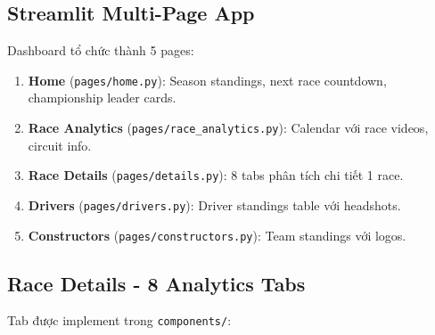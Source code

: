 \documentclass[conference,10pt]{IEEEtran}
\begin{document}
\subsection{Streamlit Multi-Page App}

Dashboard tổ chức thành 5 pages:

\begin{enumerate}
    \item \textbf{Home} (\texttt{pages/home.py}): Season standings, next race countdown, championship leader cards.
    \item \textbf{Race Analytics} (\texttt{pages/race\_analytics.py}): Calendar với race videos, circuit info.
    \item \textbf{Race Details} (\texttt{pages/details.py}): 8 tabs phân tích chi tiết 1 race.
    \item \textbf{Drivers} (\texttt{pages/drivers.py}): Driver standings table với headshots.
    \item \textbf{Constructors} (\texttt{pages/constructors.py}): Team standings với logos.
\end{enumerate}

\subsection{Race Details - 8 Analytics Tabs}

Tab được implement trong \texttt{components/}:
\end{document}
